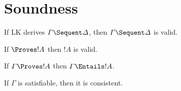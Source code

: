 \documentclass[sequent-calculus]{subfiles}
\begin{document}
\section{Soundness}


\begin{thm}
If LK derives $\Gamma \Sequent \Delta$, then $\Gamma \Sequent \Delta$ is valid.
\end{thm}

\begin{thm}
If $\Proves !A$ then $!A$ is valid.
\end{thm}

\begin{thm}
If $\Gamma \Proves !A$ then $\Gamma \Entails !A$.
\end{thm}

\begin{thm}
If $\Gamma$ is satisfiable, then it is consistent.
\end{thm}
\end{document}
